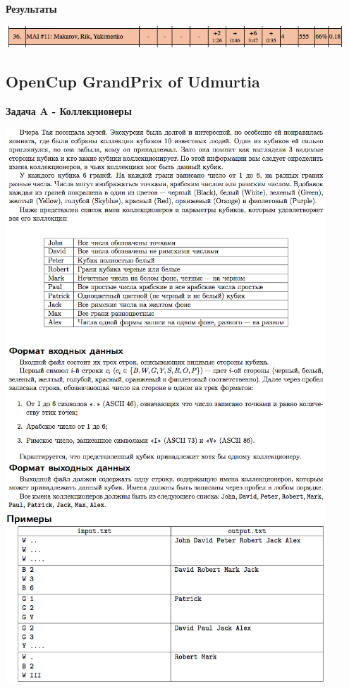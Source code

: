 \documentclass[a4paper,12pt]{article}
\begin{document}
\textbf{{\large Результаты}} \\
\begin{center}
\includegraphics[width=0.95\textwidth]{OC_Karelia/OC_Karelia_result.png}\\ [1cm]
\end{center}



%
%
\newpage
\subsection{OpenCup GrandPrix of Udmurtia}

\textbf{{\large Задача A - Коллекционеры}} \\
\begin{center}
\includegraphics[width=0.9\textwidth]{OC_Udmurtia/OC_Udmurtia_A1.png}\\ [1cm]
\includegraphics[width=0.9\textwidth]{OC_Udmurtia/OC_Udmurtia_A2.png}\\ [1cm]
\end{center}
\newpage
\end{document}
